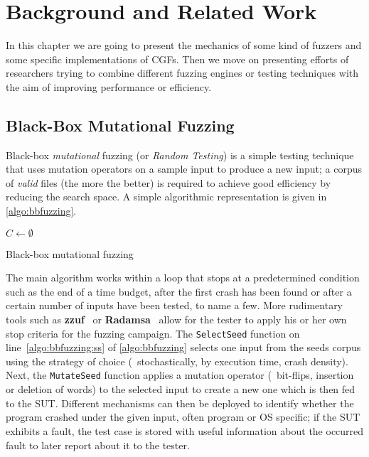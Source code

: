 \chapter{Background and Related Work}
\label{chap:related}

In this chapter we are going to present the mechanics of some kind of fuzzers
and some specific implementations of \acfp{CGF}. Then we move on presenting
efforts of researchers trying to combine different fuzzing engines or testing
techniques with the aim of improving performance or efficiency.

\section{Black-Box Mutational Fuzzing}
\label{sec:bbfuzz}
Black-box \emph{mutational} fuzzing (or \emph{Random Testing}) is a simple
testing technique that uses mutation operators on a sample input to produce a
new input; a corpus of \emph{valid} files (the more the better) is required to
achieve good efficiency by reducing the search space. A simple algorithmic
representation is given in \autoref{algo:bbfuzzing}.

\begin{algorithm}
    \DontPrintSemicolon%
    \BlankLine%
    $C \leftarrow \emptyset$\;
    \caption{Black-box mutational fuzzing}
\label{algo:bbfuzzing}
\end{algorithm}

The main algorithm works within a loop that stops at a predetermined condition
such as the end of a time budget, after the first crash has been found or after
a certain number of inputs have been tested, to name a few. More rudimentary
tools such as \textbf{zzuf}~\cite{hocevar2011zzuf} or
\textbf{Radamsa}~\cite{helin2015radamsa} allow for the tester to apply his or
her own stop criteria for the fuzzing campaign. The \texttt{SelectSeed} function
on line~\ref{algo:bbfuzzing:ss} of \autoref{algo:bbfuzzing} selects one
input from the seeds corpus using the strategy of choice (\eg~stochastically, by
execution time, crash density). Next, the \texttt{MutateSeed} function applies a
mutation operator (\eg~bit-flips, insertion or deletion of words) to the
selected input to create a new one which is then fed to the \ac{SUT}. Different
mechanisms can then be deployed to identify whether the program crashed under
the given input, often program or \ac{OS} specific; if the \ac{SUT} exhibits a
fault, the test case is stored with useful information about the occurred fault
to later report about it to the tester.

